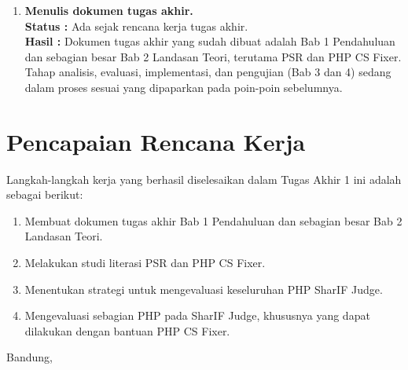 \documentclass[a4paper,twoside]{article}
\begin{document}
\begin{enumerate}
			\item \textbf{Menulis dokumen tugas akhir.}\\
			{\bf Status :} Ada sejak rencana kerja tugas akhir.\\
			{\bf Hasil :} Dokumen tugas akhir yang sudah dibuat adalah Bab 1 Pendahuluan dan sebagian besar Bab 2 Landasan Teori, terutama PSR dan PHP CS Fixer. Tahap analisis, evaluasi, implementasi, dan pengujian (Bab 3 dan 4) sedang dalam proses sesuai yang dipaparkan pada poin-poin sebelumnya.  
			
		\end{enumerate}
		
		\section{Pencapaian Rencana Kerja}
		Langkah-langkah kerja yang berhasil diselesaikan dalam Tugas Akhir 1 ini adalah sebagai berikut:
		\begin{enumerate}
			\item Membuat dokumen tugas akhir Bab 1 Pendahuluan dan sebagian besar Bab 2 Landasan Teori. 
			\item Melakukan studi literasi PSR dan PHP CS Fixer.
			\item Menentukan strategi untuk mengevaluasi keseluruhan PHP SharIF Judge.
			\item Mengevaluasi sebagian PHP pada SharIF Judge, khususnya yang dapat dilakukan dengan bantuan PHP CS Fixer.
		\end{enumerate}
		
		
		\vspace{1cm}
		\centering Bandung, \tanggal\\
		\vspace{2cm} \nama \\ 
		\vspace{1cm}
		
\end{document}

